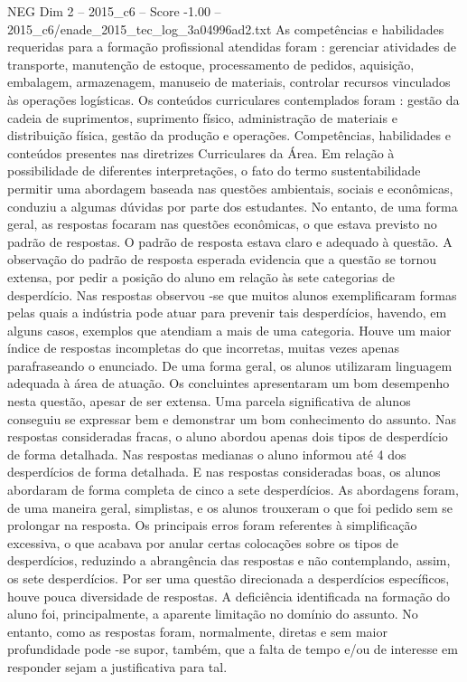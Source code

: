 \begin{textsample}{NEG Dim 2 – 2015\_c6 – Score -1.00 – 2015\_c6/enade\_2015\_tec\_log\_3a04996ad2.txt}
As competências e habilidades requeridas para a formação profissional atendidas foram : gerenciar atividades de transporte, manutenção de estoque, processamento de pedidos, aquisição, embalagem, armazenagem, manuseio de materiais, controlar recursos vinculados às operações logísticas.
Os conteúdos curriculares contemplados foram : gestão da cadeia de suprimentos, suprimento físico, administração de materiais e distribuição física, gestão da produção e operações.
Competências, habilidades e conteúdos presentes nas diretrizes Curriculares da Área.
Em relação à possibilidade de diferentes interpretações, o fato do termo sustentabilidade permitir uma abordagem baseada nas questões ambientais, sociais e econômicas, conduziu a algumas dúvidas por parte dos estudantes.
No entanto, de uma forma geral, as respostas focaram nas questões econômicas, o que estava previsto no padrão de respostas.
O padrão de resposta estava claro e adequado à questão.
A observação do padrão de resposta esperada evidencia que a questão se tornou extensa, por pedir a posição do aluno em relação às sete categorias de desperdício.
Nas respostas observou -se que muitos alunos exemplificaram formas pelas quais a indústria pode atuar para prevenir tais desperdícios, havendo, em alguns casos, exemplos que atendiam a mais de uma categoria.
Houve um maior índice de respostas incompletas do que incorretas, muitas vezes apenas parafraseando o enunciado.
De uma forma geral, os alunos utilizaram linguagem adequada à área de atuação.
Os concluintes apresentaram um bom desempenho nesta questão, apesar de ser extensa.
Uma parcela significativa de alunos conseguiu se expressar bem e demonstrar um bom conhecimento do assunto.
Nas respostas consideradas fracas, o aluno abordou apenas dois tipos de desperdício de forma detalhada.
Nas respostas medianas o aluno informou até 4 dos desperdícios de forma detalhada.
E nas respostas consideradas boas, os alunos abordaram de forma completa de cinco a sete desperdícios.
As abordagens foram, de uma maneira geral, simplistas, e os alunos trouxeram o que foi pedido sem se prolongar na resposta.
Os principais erros foram referentes à simplificação excessiva, o que acabava por anular certas colocações sobre os tipos de desperdícios, reduzindo a abrangência das respostas e não contemplando, assim, os sete desperdícios.
Por ser uma questão direcionada a desperdícios específicos, houve pouca diversidade de respostas.
A deficiência identificada na formação do aluno foi, principalmente, a aparente limitação no domínio do assunto.
No entanto, como as respostas foram, normalmente, diretas e sem maior profundidade pode -se supor, também, que a falta de tempo e/ou de interesse em responder sejam a justificativa para tal.

\end{textsample}
